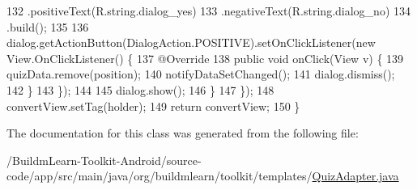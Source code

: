 \begin{DoxyCode}
132                         .positiveText(R.string.dialog\_yes)
133                         .negativeText(R.string.dialog\_no)
134                         .build();
135 
136                 dialog.getActionButton(DialogAction.POSITIVE).setOnClickListener(\textcolor{keyword}{new} View.OnClickListener()
       \{
137                     @Override
138                     \textcolor{keyword}{public} \textcolor{keywordtype}{void} onClick(View v) \{
139                         quizData.remove(position);
140                         notifyDataSetChanged();
141                         dialog.dismiss();
142                     \}
143                 \});
144 
145                 dialog.show();
146             \}
147         \});
148         convertView.setTag(holder);
149         \textcolor{keywordflow}{return} convertView;
150     \}
\end{DoxyCode}


The documentation for this class was generated from the following file\-:\begin{DoxyCompactItemize}
\item 
/\-Buildm\-Learn-\/\-Toolkit-\/\-Android/source-\/code/app/src/main/java/org/buildmlearn/toolkit/templates/\hyperlink{QuizAdapter_8java}{Quiz\-Adapter.\-java}\end{DoxyCompactItemize}
